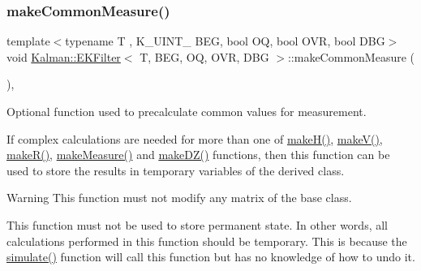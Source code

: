 \subsubsection{\texorpdfstring{make\+Common\+Measure()}{makeCommonMeasure()}}
{\footnotesize\ttfamily template$<$typename T , K\+\_\+\+U\+I\+N\+T\+\_ B\+EG, bool OQ, bool O\+VR, bool D\+BG$>$ \\
void \mbox{\hyperlink{classKalman_1_1EKFilter}{Kalman\+::\+E\+K\+Filter}}$<$ T, B\+EG, OQ, O\+VR, D\+BG $>$\+::make\+Common\+Measure (\begin{DoxyParamCaption}{ }\end{DoxyParamCaption})\hspace{0.3cm}{\ttfamily [protected]}, {\ttfamily [virtual]}}



Optional function used to precalculate common values for measurement. 

If complex calculations are needed for more than one of {\ttfamily \mbox{\hyperlink{classKalman_1_1EKFilter_a357df3cc6833241d5430c58feaed14ed}{make\+H()}}}, {\ttfamily \mbox{\hyperlink{classKalman_1_1EKFilter_a70bb019d226cbf9858954b81c89392a7}{make\+V()}}}, {\ttfamily \mbox{\hyperlink{classKalman_1_1EKFilter_aff7a7f2d08673db1330e04e349b3bb8b}{make\+R()}}}, {\ttfamily \mbox{\hyperlink{classKalman_1_1EKFilter_aac9f6d80e5ec9e6ea2ccf045cb682df8}{make\+Measure()}}} and {\ttfamily \mbox{\hyperlink{classKalman_1_1EKFilter_a54a168299879f6b3023b0a42b1afe29d}{make\+D\+Z()}}} functions, then this function can be used to store the results in temporary variables of the derived class. \begin{DoxyWarning}{Warning}
This function must not modify any matrix of the base class. 

This function must not be used to store permanent state. In other words, all calculations performed in this function should be temporary. This is because the {\ttfamily \mbox{\hyperlink{classKalman_1_1EKFilter_ae111e647e38f64bed354c85ff8f5c3ad}{simulate()}}} function will call this function but has no knowledge of how to undo it. 
\end{DoxyWarning}
\mbox{\label{classKalman_1_1EKFilter_aace6f213340e7a0c78541454b13e8586}} 
